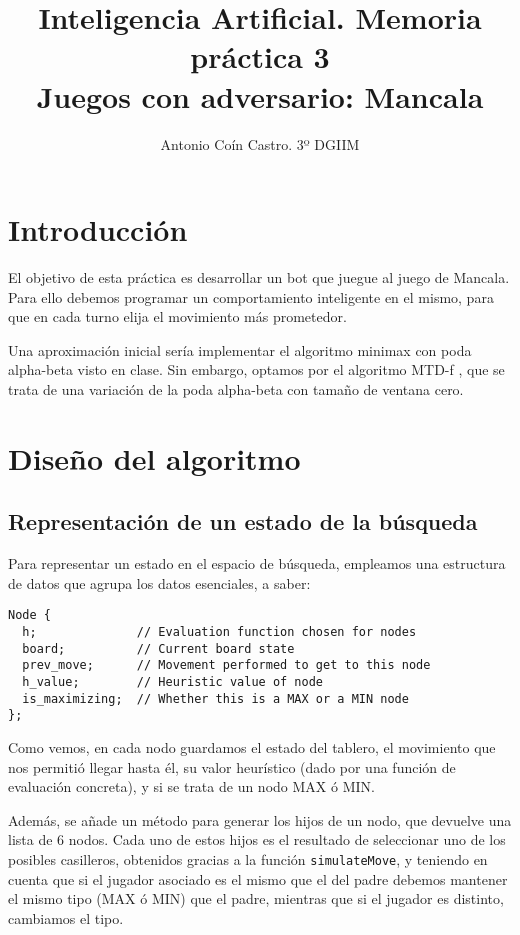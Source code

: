 \documentclass[11pt,a4paper]{article}
\title{Inteligencia Artificial. Memoria práctica 3 \\ \Large{Juegos con adversario: Mancala}}
\author{Antonio Coín Castro. 3º DGIIM}
\date{}
\begin{document}
\maketitle

\section{Introducción}

El objetivo de esta práctica es desarrollar un bot que juegue al juego de Mancala. Para ello debemos programar un comportamiento inteligente en el mismo, para que en cada turno elija el movimiento más prometedor.

Una aproximación inicial sería implementar el algoritmo minimax con poda alpha-beta visto en clase. Sin embargo, optamos por el algoritmo MTD-f \cite{mtdf}, que se trata de una variación de la poda alpha-beta con tamaño de ventana cero.

\section{Diseño del algoritmo}

\subsection*{Representación de un estado de la búsqueda}

Para representar un estado en el espacio de búsqueda, empleamos una estructura de datos que agrupa los datos esenciales, a saber:

\begin{verbatim}
Node {
  h;              // Evaluation function chosen for nodes
  board;          // Current board state
  prev_move;      // Movement performed to get to this node
  h_value;        // Heuristic value of node
  is_maximizing;  // Whether this is a MAX or a MIN node
};
\end{verbatim}

Como vemos, en cada nodo guardamos el estado del tablero, el movimiento que nos permitió llegar hasta él, su valor heurístico (dado por una función de evaluación concreta), y si se trata de un nodo MAX ó MIN. 

Además, se añade un método para generar los hijos de un nodo, que devuelve una lista de 6 nodos. Cada uno de estos hijos es el resultado de seleccionar uno de los posibles casilleros, obtenidos gracias a la función \verb|simulateMove|, y teniendo en cuenta que si el jugador asociado es el mismo que el del padre debemos mantener el mismo tipo (MAX ó MIN) que el padre, mientras que si el jugador es distinto, cambiamos el tipo.
\end{document}

